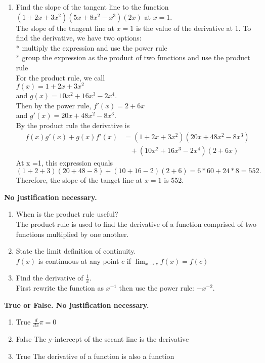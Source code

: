 \documentclass[a4paper, 12pt]{article}
\newcommand{\bt}[1]{\textbf{#1}} %
\newcommand{\eq}[1]{\begin{align*}#1\end{align*}} %
\renewcommand{\eq}[1]{\begin{align*}#1\end{align*}} %
\newcommand{\green}[1]{\textcolor{javagreen}{#1}} %
\begin{document}
\begin{enumerate}
    \item Find the slope of the tangent line to the function 
    $(1+2x + 3x^2)(5x +8x^2-x^3)(2x)$ at $x=1$. \\
    \green{
    The slope of the tangent line at $x=1$ is the value of the derivative at 1.
    To find the derivative, we have two options: \\
    * multiply the expression and use the power rule \\
    * group the expression as the product of two functions and use the product rule \\
    For the product rule, we call \\
    $f(x) = 1 + 2x + 3x^2$ \\ and $g(x) = 10x^2 + 16x^3 - 2x^4$.\\
    Then by the power rule, $f'(x) = 2 + 6x$\\ and $g'(x) = 20x + 48x^2 -8x^3.$ \\
    By the product rule the derivative is 
    \eq{ f(x) g'(x) + g(x)f'(x)  
    &= (1+2x+3x^2)(20x+48x^2-8x^3)  \\
    &\ \ \ \ + (10x^2+16x^3-2x^4)(2+6x)
    }
    At x =1, this expression equals 
    $$(1 + 2 + 3)(20 + 48-8) + (10 + 16 -2)(2+6) = 6*60 + 24*8 = 552.$$
    Therefore, the slope of the tanget line at $x=1$ is 552.
    }
\end{enumerate}

\bt{No justification necessary.}

\begin{enumerate}[resume]
    \item When is the product rule useful? \\
    \green{The product rule is used to find the derivative of a function comprised of two functions
    multiplied by one another.
    }
    \item State the limit definition of continuity. \\
    \green{$f(x)$ is continuous at any point $c$ if $\lim_{x \rightarrow c} f(x) = f(c)$
    }
    
    \item Find the derivative of $\frac{1}{x}$. \\
    \green{First rewrite the function as $x^{-1}$ then use the power rule: 
    $-x^{-2}$.
    }
\end{enumerate}

\bt{True or False. No justification necessary.}

\begin{enumerate}[resume]
    \item \green{True} $\frac{d}{dx} \pi = 0$
    \item \green{False} The y-intercept of the secant line is the derivative
    \item \green{True} The derivative of a function is also a function
\end{enumerate}
\end{document}
